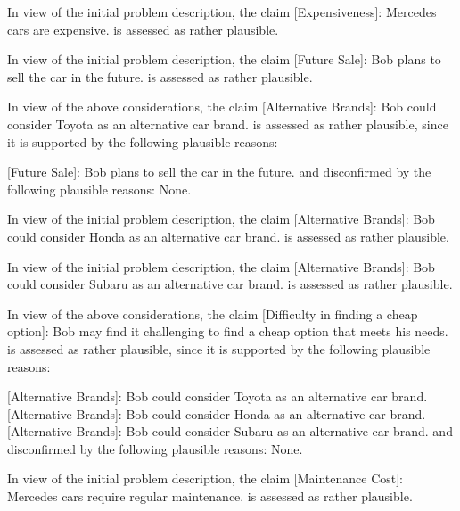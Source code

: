 \documentclass[
  letterpaper,
  DIV=11,
  numbers=noendperiod]{scrartcl}
\newenvironment{Shaded}{\begin{snugshade}}{\end{snugshade}}
\newcommand{\CommentTok}[1]{\textcolor[rgb]{0.37,0.37,0.37}{#1}}
\newcommand{\NormalTok}[1]{\textcolor[rgb]{0.00,0.23,0.31}{#1}}
\newcommand{\OtherTok}[1]{\textcolor[rgb]{0.00,0.23,0.31}{#1}}
\begin{document}
\begin{Shaded}
\begin{Highlighting}[]
\NormalTok{In view of the initial problem description, the claim \textquotesingle{}}\CommentTok{[}\OtherTok{Expensiveness}\CommentTok{]}\NormalTok{: Mercedes cars are expensive.\textquotesingle{} is assessed as rather plausible.}

\NormalTok{In view of the initial problem description, the claim \textquotesingle{}}\CommentTok{[}\OtherTok{Future Sale}\CommentTok{]}\NormalTok{: Bob plans to sell the car in the future.\textquotesingle{} is assessed as rather plausible.}

\NormalTok{In view of the above considerations, the claim \textquotesingle{}}\CommentTok{[}\OtherTok{Alternative Brands}\CommentTok{]}\NormalTok{: Bob could consider Toyota as an alternative car brand.\textquotesingle{} is assessed as rather plausible, since it is supported by the following plausible reasons:}

\OtherTok{[Future Sale]: }\NormalTok{Bob plans to sell the car in the future.}
\NormalTok{and disconfirmed by the following plausible reasons:}
\NormalTok{None.}

\NormalTok{In view of the initial problem description, the claim \textquotesingle{}}\CommentTok{[}\OtherTok{Alternative Brands}\CommentTok{]}\NormalTok{: Bob could consider Honda as an alternative car brand.\textquotesingle{} is assessed as rather plausible.}

\NormalTok{In view of the initial problem description, the claim \textquotesingle{}}\CommentTok{[}\OtherTok{Alternative Brands}\CommentTok{]}\NormalTok{: Bob could consider Subaru as an alternative car brand.\textquotesingle{} is assessed as rather plausible.}

\NormalTok{In view of the above considerations, the claim \textquotesingle{}}\CommentTok{[}\OtherTok{Difficulty in finding a cheap option}\CommentTok{]}\NormalTok{: Bob may find it challenging to find a cheap option that meets his needs.\textquotesingle{} is assessed as rather plausible, since it is supported by the following plausible reasons:}

\OtherTok{[Alternative Brands]: }\NormalTok{Bob could consider Toyota as an alternative car brand.}
\OtherTok{[Alternative Brands]: }\NormalTok{Bob could consider Honda as an alternative car brand.}
\OtherTok{[Alternative Brands]: }\NormalTok{Bob could consider Subaru as an alternative car brand.}
\NormalTok{and disconfirmed by the following plausible reasons:}
\NormalTok{None.}

\NormalTok{In view of the initial problem description, the claim \textquotesingle{}}\CommentTok{[}\OtherTok{Maintenance Cost}\CommentTok{]}\NormalTok{: Mercedes cars require regular maintenance.\textquotesingle{} is assessed as rather plausible.}


\end{Highlighting}
\end{Shaded}
\end{document}
